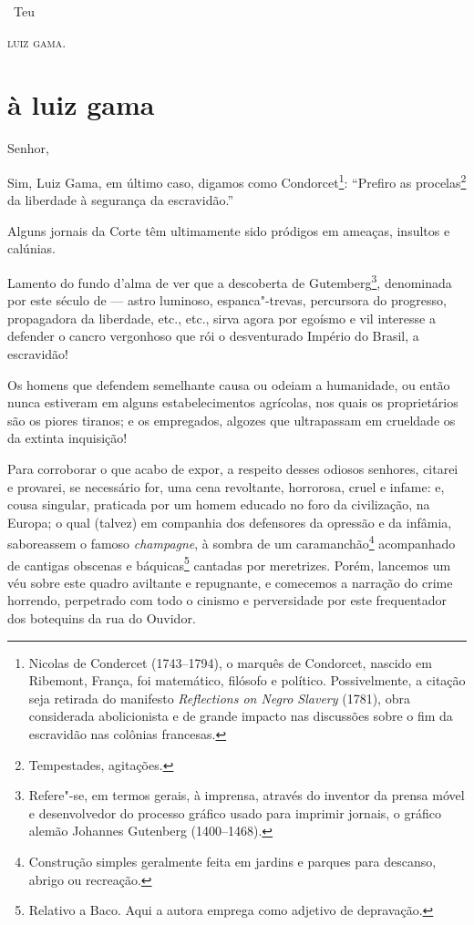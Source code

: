 \hfill\ Teu

\hfill\textsc{luiz gama.}


\section*{à luiz gama}

\noindent{}Senhor,%


Sim, Luiz Gama, em último caso, digamos como Condorcet\footnote{
  Nicolas de Condercet (1743--1794), o marquês de Condorcet, nascido em
  Ribemont, França, foi matemático, filósofo e político. Possivelmente,
  a citação seja retirada do manifesto \emph{Reflections on Negro
  Slavery} (1781), obra considerada abolicionista e de grande impacto
  nas discussões sobre o fim da escravidão nas colônias francesas.}:
``Prefiro as procelas\footnote{Tempestades, agitações.} da liberdade à
segurança da escravidão.''

Alguns jornais da Corte têm ultimamente sido pródigos em ameaças,
insultos e calúnias.

Lamento do fundo d'alma de ver que a descoberta de Gutemberg\footnote{
  Refere"-se, em termos gerais, à imprensa, através do inventor da prensa
  móvel e desenvolvedor do processo gráfico usado para imprimir jornais,
  o gráfico alemão Johannes Gutenberg (1400--1468).}, denominada por este
século de --- astro luminoso, espanca"-trevas, percursora do progresso,
propagadora da liberdade, etc., etc., sirva agora por egoísmo e vil
interesse a defender o cancro vergonhoso que rói o desventurado Império
do Brasil, a escravidão!

Os homens que defendem semelhante causa ou odeiam a humanidade, ou então
nunca estiveram em alguns estabelecimentos agrícolas, nos quais os
proprietários são os piores tiranos; e os empregados, algozes que
ultrapassam em crueldade os da extinta inquisição!

Para corroborar o que acabo de expor, a respeito desses odiosos
senhores, citarei e provarei, se necessário for, uma cena revoltante,
horrorosa, cruel e infame: e, cousa singular, praticada por um homem
educado no foro da civilização, na Europa; o qual (talvez) em companhia
dos defensores da opressão e da infâmia, saboreassem o famoso
\emph{champagne}, à sombra de um caramanchão\footnote{Construção
  simples geralmente feita em jardins e parques para descanso, abrigo ou
  recreação.} acompanhado de cantigas obscenas e báquicas\footnote{
  Relativo a Baco. Aqui a autora emprega como adjetivo de depravação.}
cantadas por meretrizes. Porém, lancemos um véu sobre este quadro
aviltante e repugnante, e comecemos a narração do crime horrendo,
perpetrado com todo o cinismo e perversidade por este frequentador dos
botequins da rua do Ouvidor.

